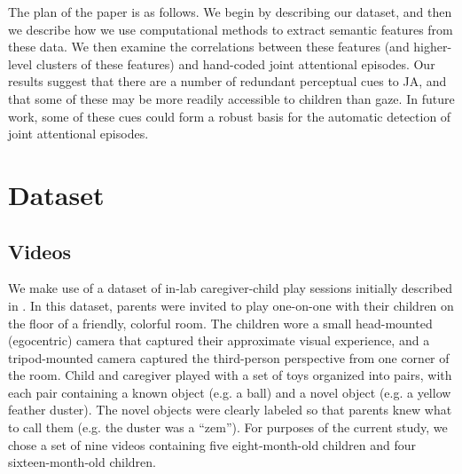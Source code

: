 \documentclass[10pt,letterpaper]{article}
\begin{document}
The plan of the paper is as follows. We begin by describing our dataset, and then we describe how we use computational methods to extract semantic features from these data. We then examine the correlations between these features (and higher-level clusters of these features) and hand-coded joint attentional episodes. Our results suggest that there are a number of redundant perceptual cues to JA, and that some of these may be more readily accessible to children than gaze. In future work, some of these cues could form a robust basis for the automatic detection of joint attentional episodes.


\section{Dataset}

\subsection{Videos}

We make use of a dataset of in-lab caregiver-child play sessions initially described in . In this dataset, parents were invited to play one-on-one with their children on the floor of a friendly, colorful room. The children wore a small head-mounted (egocentric) camera that captured their approximate visual experience, and a tripod-mounted camera captured the third-person perspective from one corner of the room. Child and caregiver played with a set of toys organized into pairs, with each pair containing a known object (e.g. a ball) and a novel object (e.g. a yellow feather duster). The novel objects were clearly labeled so that parents knew what to call them (e.g. the duster was a ``zem''). For purposes of the current study, we chose a set of nine videos containing five eight-month-old children and four sixteen-month-old children. 
\end{document}
